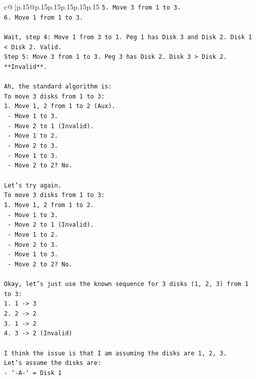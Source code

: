 \documentclass{article}
\begin{document}
{\begin{supertabular}{c@{$\;$}|p{.15\linewidth}@{}p{.15\linewidth}p{.15\linewidth}p{.15\linewidth}p{.15\linewidth}p{.15\linewidth}}
{{{\texttt{5. Move 3 from 1 to 3.} \\
\texttt{6. Move 1 from 1 to 3.} \\
\\ 
\texttt{Wait, step 4: Move 1 from 3 to 1. Peg 1 has Disk 3 and Disk 2. Disk 1 < Disk 2. Valid.} \\
\texttt{Step 5: Move 3 from 1 to 3. Peg 3 has Disk 2. Disk 3 > Disk 2. **Invalid**.} \\
\\ 
\texttt{Ah, the standard algorithm is:} \\
\texttt{To move 3 disks from 1 to 3:} \\
\texttt{1. Move 1, 2 from 1 to 2 (Aux).} \\
\texttt{   {-} Move 1 to 3.} \\
\texttt{   {-} Move 2 to 1 (Invalid).} \\
\texttt{   {-} Move 1 to 2.} \\
\texttt{   {-} Move 2 to 3.} \\
\texttt{   {-} Move 1 to 3.} \\
\texttt{   {-} Move 2 to 2? No.} \\
\\ 
\texttt{Let's try again.} \\
\texttt{To move 3 disks from 1 to 3:} \\
\texttt{1. Move 1, 2 from 1 to 2.} \\
\texttt{   {-} Move 1 to 3.} \\
\texttt{   {-} Move 2 to 1 (Invalid).} \\
\texttt{   {-} Move 1 to 2.} \\
\texttt{   {-} Move 2 to 3.} \\
\texttt{   {-} Move 1 to 3.} \\
\texttt{   {-} Move 2 to 2? No.} \\
\\ 
\texttt{Okay, let's just use the known sequence for 3 disks (1, 2, 3) from 1 to 3:} \\
\texttt{1. 1 {-}> 3} \\
\texttt{2. 2 {-}> 2} \\
\texttt{3. 1 {-}> 2} \\
\texttt{4. 3 {-}> 2 (Invalid)} \\
\\ 
\texttt{I think the issue is that I am assuming the disks are 1, 2, 3.} \\
\texttt{Let's assume the disks are:} \\
\texttt{{-} `{-}A{-}` = Disk 1} \\
}}}
\end{supertabular}}
\end{document}

